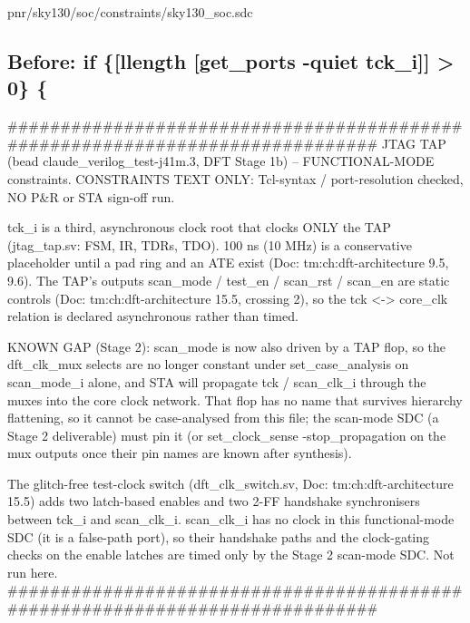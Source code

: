 \begin{relocated}{pnr/sky130/soc/constraints/sky130_soc.sdc}

\subsection*{Before: if \{[llength [get\_ports -quiet tck\_i]] > 0\} \{}

\begin{textblock}
##############################################################################
JTAG TAP (bead claude_verilog_test-j41m.3, DFT Stage 1b) -- FUNCTIONAL-MODE constraints.
CONSTRAINTS TEXT ONLY: Tcl-syntax / port-resolution checked, NO P&R or STA sign-off run.

tck_i is a third, asynchronous clock root that clocks ONLY the TAP (jtag_tap.sv: FSM, IR,
TDRs, TDO). 100 ns (10 MHz) is a conservative placeholder until a pad ring and an ATE
exist (Doc: tm:ch:dft-architecture 9.5, 9.6). The TAP's outputs scan_mode / test_en / scan_rst /
scan_en are static controls (Doc: tm:ch:dft-architecture 15.5, crossing 2), so the tck <-> core_clk
relation is declared asynchronous rather than timed.

KNOWN GAP (Stage 2): scan_mode is now also driven by a TAP flop, so the dft_clk_mux selects
are no longer constant under set_case_analysis on scan_mode_i alone, and STA will propagate
tck / scan_clk_i through the muxes into the core clock network. That flop has no name that
survives hierarchy flattening, so it cannot be case-analysed from this file; the scan-mode
SDC (a Stage 2 deliverable) must pin it (or set_clock_sense -stop_propagation on the mux
outputs once their pin names are known after synthesis).

The glitch-free test-clock switch (dft_clk_switch.sv, Doc: tm:ch:dft-architecture 15.5) adds two latch-based
enables and two 2-FF handshake synchronisers between tck_i and scan_clk_i. scan_clk_i has no clock in
this functional-mode SDC (it is a false-path port), so their handshake paths and the clock-gating
checks on the enable latches are timed only by the Stage 2 scan-mode SDC. Not run here.
##############################################################################
\end{textblock}


\end{relocated}
